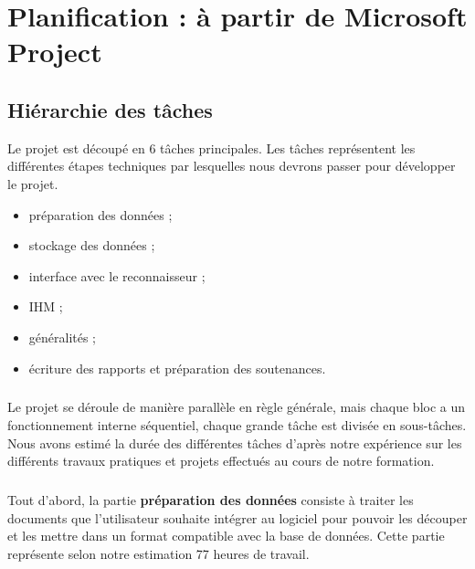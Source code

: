 
\chapter{Planification : à partir de Microsoft Project}

\section{Hiérarchie des tâches}

Le projet est découpé en 6 tâches principales. Les tâches représentent les différentes
étapes techniques par lesquelles nous devrons passer pour développer le projet.

\begin{itemize}
\item préparation des données ;
\item stockage des données ;
\item interface avec le reconnaisseur ;
\item IHM ;
\item généralités ;
\item écriture des rapports et préparation des soutenances.
\end{itemize}

\paragraph{}

Le projet se déroule de manière parallèle en règle générale, mais chaque bloc a un fonctionnement interne séquentiel, chaque grande tâche est divisée en sous-tâches. Nous avons estimé la durée des différentes tâches d’après notre expérience sur les différents travaux pratiques et projets effectués au cours de notre formation.

\paragraph{}

Tout d’abord, la partie \textbf{préparation des données} consiste à traiter les documents que l’utilisateur souhaite intégrer au logiciel pour pouvoir les découper et les mettre dans un format compatible avec la base de données. Cette partie représente selon notre estimation 77 heures de travail.

\paragraph{}

